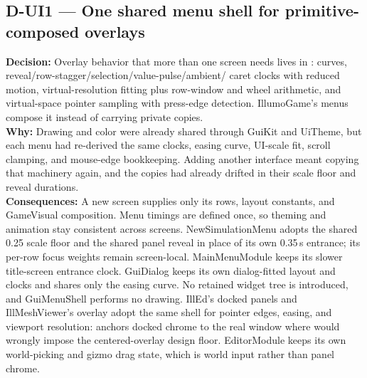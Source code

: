 \subsection*{D-UI1 --- One shared menu shell for primitive-composed overlays}
\begin{decisionbox}[title={D-UI1 \quad 2026-09-16}]
\textbf{Decision:} Overlay behavior that more than one screen needs lives in
:  curves,
 reveal/row-stagger/selection/value-pulse/ambient/
caret clocks with reduced motion,  virtual-resolution
fitting plus row-window and wheel arithmetic, and 
virtual-space pointer sampling with press-edge detection. IllumoGame's menus
compose it instead of carrying private copies.\\
\textbf{Why:} Drawing and color were already shared through GuiKit and UiTheme,
but each menu had re-derived the same clocks, easing curve, UI-scale fit,
scroll clamping, and mouse-edge bookkeeping. Adding another interface meant
copying that machinery again, and the copies had already drifted in their
scale floor and reveal durations.\\
\textbf{Consequences:} A new screen supplies only its rows, layout constants,
and GameVisual composition. Menu timings are defined once, so theming and
animation stay consistent across screens. NewSimulationMenu adopts the shared
0.25 scale floor and the shared panel reveal in place of its own 0.35\,s
entrance; its per-row focus weights remain screen-local. MainMenuModule keeps
its slower title-screen entrance clock. GuiDialog keeps its own dialog-fitted
layout and clocks and shares only the easing curve. No retained widget tree is
introduced, and GuiMenuShell performs no drawing. IllEd's docked panels and
IllMeshViewer's overlay adopt the same shell for pointer edges, easing, and
viewport resolution:  anchors docked chrome
to the real window where  would wrongly impose
the centered-overlay design floor. EditorModule keeps its own world-picking and
gizmo drag state, which is world input rather than panel chrome.
\end{decisionbox}

